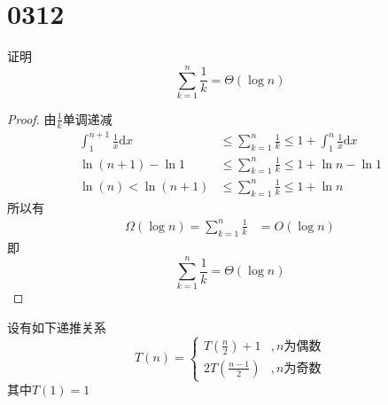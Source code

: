 \section{0312}
\begin{questions}

    \question 证明$$\sum_{k=1}^n {\frac{1}{k}} = \Theta(\log n)$$
    \begin{solution}
        \begin{proof}
            由$\frac{1}{k}$单调递减\begin{align*}
                \int_{1}^{n+1} {\frac{1}{x}} \mathrm{d}x
                                      & \leq \sum_{k=1}^n {\frac{1}{k}} \leq 1 + \int_1^{n} {\frac{1}{x}} \mathrm{d}x \\
                \ln{(n+1)} - \ln{1}   & \leq \sum_{k=1}^n {\frac{1}{k}} \leq 1 + \ln{n} - \ln{1}                      \\
                \ln{(n)} < \ln{(n+1)} & \leq \sum_{k=1}^n {\frac{1}{k}} \leq 1 + \ln{n}
            \end{align*}
            所以有\begin{align*}
                \Omega(\log{n}) = \sum_{k=1}^n {\frac{1}{k}} & = O(\log{n})
            \end{align*}
            即$$
                \sum_{k=1}^n {\frac{1}{k}} = \Theta(\log{n})
            $$
        \end{proof}
    \end{solution}


    \question 设有如下递推关系 $$
        T(n) = \begin{cases}
            T(\frac{n}{2}) + 1 & , n\text{为偶数} \\
            2T(\frac{n-1}{2})  & , n\text{为奇数}
        \end{cases}
    $$其中$T(1) = 1$
\end{questions}
